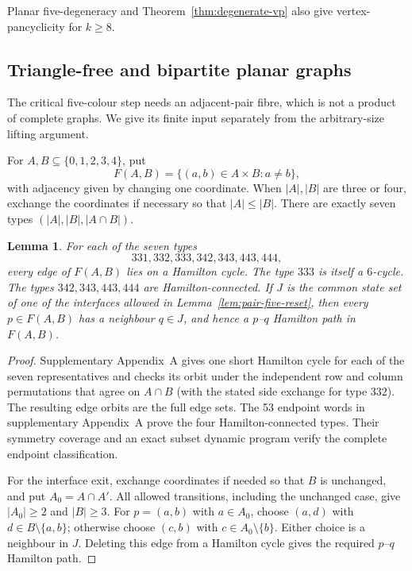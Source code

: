 \documentclass[11pt]{article}
\newtheorem{lemma}[theorem]{Lemma}
\theoremstyle{remark}
\numberwithin{equation}{section}
\numberwithin{table}{section}
\begin{document}
Planar five-degeneracy and Theorem~\ref{thm:degenerate-vp} also give
vertex-pancyclicity for $k\ge8$.

\subsection{Triangle-free and bipartite planar graphs}

The critical five-colour step needs an adjacent-pair fibre, which is
not a product of complete graphs.  We give its finite input separately
from the arbitrary-size lifting argument.

For $A,B\subseteq\{0,1,2,3,4\}$, put
\[
 F(A,B)=\{(a,b)\in A\times B:a\ne b\},
\]
with adjacency given by changing one coordinate.  When $|A|,|B|$ are
three or four, exchange the coordinates if necessary so that
$|A|\le|B|$.  There are exactly seven types
$(|A|,|B|,|A\cap B|)$.

\begin{lemma}
\label{lem:pair-five-endpoints}
For each of the seven types
\[
331,332,333,342,343,443,444,
\]
every edge of $F(A,B)$ lies on a Hamilton cycle.  The type $333$ is
itself a $6$-cycle.  The types $342,343,443,444$ are
Hamilton-connected.  If $J$ is the common state set of one of the
interfaces allowed in Lemma~\ref{lem:pair-five-reset}, then every
$p\in F(A,B)$ has a neighbour $q\in J$, and hence a $p$--$q$
Hamilton path in $F(A,B)$.
\end{lemma}

\begin{proof}
Supplementary Appendix~A gives one short Hamilton cycle for each of
the seven representatives and checks its orbit under the independent
row and column permutations that agree on $A\cap B$ (with the stated
side exchange for type $332$).  The resulting edge orbits are the full
edge sets.  The 53 endpoint words in supplementary Appendix~A prove the four
Hamilton-connected types. Their symmetry coverage and an exact subset
dynamic program verify the complete endpoint classification.

For the interface exit, exchange coordinates if needed so that
$B$ is unchanged, and put $A_0=A\cap A'$. All allowed transitions,
including the unchanged case, give $|A_0|\ge2$ and $|B|\ge3$.
For $p=(a,b)$ with $a\in A_0$, choose $(a,d)$ with
$d\in B\setminus\{a,b\}$; otherwise choose $(c,b)$ with
$c\in A_0\setminus\{b\}$. Either choice is a neighbour in $J$.
Deleting this edge from a Hamilton cycle gives the required
$p$--$q$ Hamilton path.
\end{proof}
\end{document}

